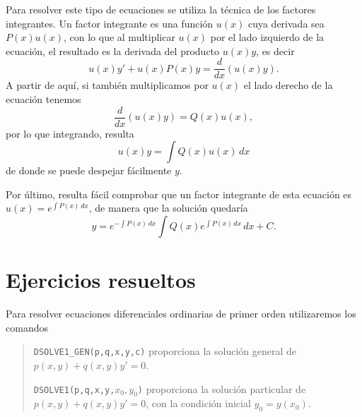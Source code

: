 Para resolver este tipo de ecuaciones se utiliza la técnica de los factores integrantes. 
Un factor integrante es una función $u(x)$ cuya derivada sea $P(x)u(x)$, con lo que al multiplicar $u(x)$ por el lado
izquierdo de la ecuación, el resultado es la derivada del producto $u(x)y$, es decir
\[
u(x)y'+u(x)P(x)y=\frac{d}{dx}(u(x)y).
\]
A partir de aquí, si también multiplicamos por $u(x)$ el lado derecho de la ecuación tenemos
\[
\frac{d}{dx}(u(x)y)=Q(x)u(x),
\]
por lo que integrando, resulta
\[
u(x)y=\int Q(x)u(x)\,dx
\]
de donde se puede despejar fácilmente $y$.

Por último, resulta fácil comprobar que un factor integrante de esta ecuación es $u(x)=e^{\int P(x)\, dx}$, de manera
que la solución quedaría
\[
y=e^{-\int P(x)\,dx}\int Q(x)e^{\int P(x)\,dx}\,dx+C.
\]

\newpage

\section{Ejercicios resueltos}
\begin{indication}
Para resolver ecuaciones diferenciales ordinarias de primer orden utilizaremos los comandos
\begin{quote}
\texttt{DSOLVE1\_GEN(p,q,x,y,c)} proporciona la solución general de $p(x,y)+q(x,y)y'=0$.

\texttt{DSOLVE1(p,q,x,y,$x_{0},y_{0}$)} proporciona la solución particular de $p(x,y)+q(x,y)y'=0$, con la condición inicial $y_{0}=y(x_{0})$.
\end{quote}
\end{indication}

